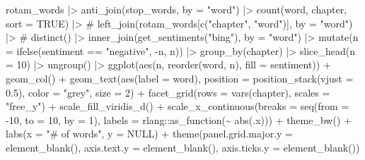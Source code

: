 \documentclass[
  letterpaper,
  DIV=11,
  numbers=noendperiod]{scrreprt}
\newenvironment{Shaded}{\begin{snugshade}}{\end{snugshade}}
\newcommand{\AttributeTok}[1]{\textcolor[rgb]{0.40,0.46,0.14}{#1}}
\newcommand{\CommentTok}[1]{\textcolor[rgb]{0.37,0.37,0.37}{#1}}
\newcommand{\ConstantTok}[1]{\textcolor[rgb]{0.56,0.35,0.01}{#1}}
\newcommand{\DecValTok}[1]{\textcolor[rgb]{0.68,0.00,0.00}{#1}}
\newcommand{\FloatTok}[1]{\textcolor[rgb]{0.68,0.00,0.00}{#1}}
\newcommand{\FunctionTok}[1]{\textcolor[rgb]{0.28,0.35,0.67}{#1}}
\newcommand{\NormalTok}[1]{\textcolor[rgb]{0.00,0.46,0.62}{#1}}
\newcommand{\SpecialCharTok}[1]{\textcolor[rgb]{0.37,0.37,0.37}{#1}}
\newcommand{\StringTok}[1]{\textcolor[rgb]{0.13,0.47,0.30}{#1}}
\begin{document}
\begin{Shaded}
\begin{Highlighting}[]
\NormalTok{rotam\_words }\SpecialCharTok{|\textgreater{}} 
    \FunctionTok{anti\_join}\NormalTok{(stop\_words, }\AttributeTok{by =} \StringTok{"word"}\NormalTok{) }\SpecialCharTok{|\textgreater{}} 
    \FunctionTok{count}\NormalTok{(word, chapter, }\AttributeTok{sort =} \ConstantTok{TRUE}\NormalTok{) }\SpecialCharTok{|\textgreater{}} 
    \CommentTok{\# left\_join(rotam\_words[c("chapter", "word")], by = "word") |\textgreater{} }
    \CommentTok{\# distinct() |\textgreater{} }
    \FunctionTok{inner\_join}\NormalTok{(}\FunctionTok{get\_sentiments}\NormalTok{(}\StringTok{"bing"}\NormalTok{), }\AttributeTok{by =} \StringTok{"word"}\NormalTok{) }\SpecialCharTok{|\textgreater{}} 
    \FunctionTok{mutate}\NormalTok{(}\AttributeTok{n =} \FunctionTok{ifelse}\NormalTok{(sentiment }\SpecialCharTok{==} \StringTok{"negative"}\NormalTok{, }\SpecialCharTok{{-}}\NormalTok{n, n)) }\SpecialCharTok{|\textgreater{}} 
    \FunctionTok{group\_by}\NormalTok{(chapter) }\SpecialCharTok{|\textgreater{}} 
    \FunctionTok{slice\_head}\NormalTok{(}\AttributeTok{n =} \DecValTok{10}\NormalTok{) }\SpecialCharTok{|\textgreater{}} 
    \FunctionTok{ungroup}\NormalTok{() }\SpecialCharTok{|\textgreater{}} 
    \FunctionTok{ggplot}\NormalTok{(}\FunctionTok{aes}\NormalTok{(n, }\FunctionTok{reorder}\NormalTok{(word, n), }\AttributeTok{fill =}\NormalTok{ sentiment)) }\SpecialCharTok{+}
    \FunctionTok{geom\_col}\NormalTok{() }\SpecialCharTok{+}
    \FunctionTok{geom\_text}\NormalTok{(}\FunctionTok{aes}\NormalTok{(}\AttributeTok{label =}\NormalTok{ word), }\AttributeTok{position =} \FunctionTok{position\_stack}\NormalTok{(}\AttributeTok{vjust =} \FloatTok{0.5}\NormalTok{), }
              \AttributeTok{color =} \StringTok{"grey"}\NormalTok{, }\AttributeTok{size =} \DecValTok{2}\NormalTok{) }\SpecialCharTok{+}
    \FunctionTok{facet\_grid}\NormalTok{(}\AttributeTok{rows =} \FunctionTok{vars}\NormalTok{(chapter), }\AttributeTok{scales =} \StringTok{"free\_y"}\NormalTok{) }\SpecialCharTok{+}
    \FunctionTok{scale\_fill\_viridis\_d}\NormalTok{() }\SpecialCharTok{+}
    \FunctionTok{scale\_x\_continuous}\NormalTok{(}\AttributeTok{breaks =} \FunctionTok{seq}\NormalTok{(}\AttributeTok{from =} \SpecialCharTok{{-}}\DecValTok{10}\NormalTok{, }\AttributeTok{to =} \DecValTok{10}\NormalTok{, }\AttributeTok{by =} \DecValTok{1}\NormalTok{), }
                       \AttributeTok{labels =}\NormalTok{ rlang}\SpecialCharTok{::}\FunctionTok{as\_function}\NormalTok{(}\SpecialCharTok{\textasciitilde{}} \FunctionTok{abs}\NormalTok{(.x))) }\SpecialCharTok{+}
    \FunctionTok{theme\_bw}\NormalTok{() }\SpecialCharTok{+}
    \FunctionTok{labs}\NormalTok{(}\AttributeTok{x =} \StringTok{"\# of words"}\NormalTok{, }\AttributeTok{y =} \ConstantTok{NULL}\NormalTok{) }\SpecialCharTok{+}
    \FunctionTok{theme}\NormalTok{(}\AttributeTok{panel.grid.major.y =} \FunctionTok{element\_blank}\NormalTok{(),}
          \AttributeTok{axis.text.y =} \FunctionTok{element\_blank}\NormalTok{(), }\AttributeTok{axis.ticks.y =} \FunctionTok{element\_blank}\NormalTok{())}
\end{Highlighting}
\end{Shaded}
\end{document}
